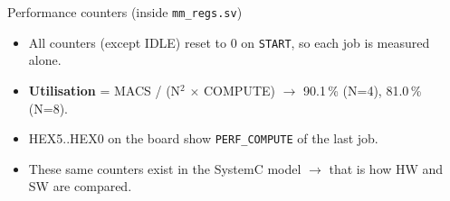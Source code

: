 \documentclass[aspectratio=169,11pt]{beamer}
\newcommand{\file}[1]{\texttt{\textcolor{copper}{#1}}}
\newcommand{\sig}[1]{\texttt{#1}}
\begin{document}
\begin{frame}{Performance counters (inside \file{mm\_regs.sv})}
  \centering\small
  \vspace{4mm}

  \raggedright
  \begin{itemize}\small
    \item All counters (except IDLE) reset to 0 on \sig{START}, so each job is measured alone.
    \item \textbf{Utilisation} = MACS / (N$^2$ $\times$ COMPUTE) $\to$ 90.1\,\% (N=4), 81.0\,\% (N=8).
    \item HEX5..HEX0 on the board show \sig{PERF\_COMPUTE} of the last job.
    \item These same counters exist in the SystemC model $\to$ that is how HW and SW are compared.
  \end{itemize}
\end{frame}
\end{document}
